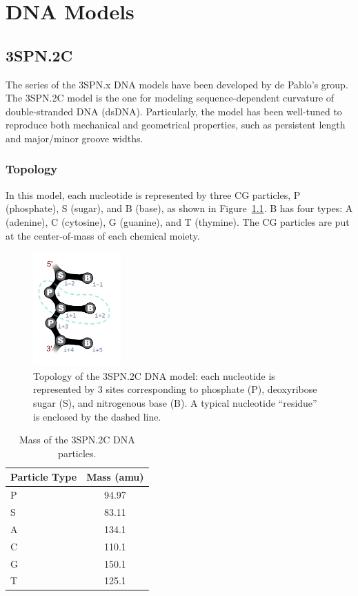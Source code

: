 \chapter{DNA Models}
\label{chap:dna}


\section{3SPN.2C}
\label{sec:dna_3spn2c}

The series of the 3SPN.x DNA models have been developed by de Pablo's group.
The 3SPN.2C model is the one for modeling sequence-dependent curvature of
double-stranded DNA (dsDNA).  Particularly, the model has been well-tuned to
reproduce both mechanical and geometrical properties, such as persistent length
and major/minor groove widths.

\subsection{Topology}
\label{subsec:dna_3spn2c_top}

In this model, each nucleotide is represented by three CG particles, P
(phosphate), S (sugar), and B (base), as shown in
Figure~\ref{fig:dna_3spn2c_top}.  B has four types: A (adenine), C (cytosine), G
(guanine), and T (thymine).  The CG particles are put at the center-of-mass of
each chemical moiety.

\begin{figure}[ht]
  \centering
  \includegraphics[width=0.3\textwidth]{figures/DNA_3spn2c_top.png}
  \caption{Topology of the 3SPN.2C DNA model: each nucleotide is represented by
    3 sites corresponding to phosphate (P), deoxyribose sugar (S), and
    nitrogenous base (B).  A typical nucleotide ``residue'' is enclosed by the
    dashed line.}
  \label{fig:dna_3spn2c_top}
\end{figure}


\begin{table}[ht]
  \centering
  \begin{tabular}{lc}
    \toprule
    Particle Type    & Mass (amu) \\
    \midrule
    P  &  94.97 \\
    S  &  83.11 \\
    A  &  134.1 \\
    C  &  110.1 \\
    G  &  150.1 \\
    T  &  125.1 \\
    \bottomrule
  \end{tabular}
  \caption{Mass of the 3SPN.2C DNA particles.}
  \label{tab:dna_3spn2c_top_mass}
\end{table}

